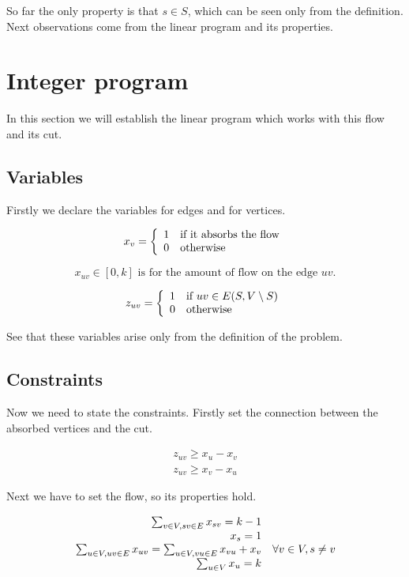 \documentclass{article}
\begin{document}
	So far the only property is that $s \in S$, which can be seen only from the definition. Next observations come from the linear program and its properties.
	
	
	\section{Integer program}
	
	In this section we will establish the linear program which works with this flow and its cut.
	
	\subsection{Variables}
	
	Firstly we declare the variables for edges and for vertices.
	
	$$
	x_v = \left\{\begin{array}{l l}
		1 & \text{if it absorbs the flow} \\
		0 & \text{otherwise}
	\end{array}
	\right.
	$$
	
	$$
	x_{uv} \in [0,k] \text{ is for the amount of flow on the edge } uv.
	$$
	
	$$
	z_{uv} = \left\{\begin{array}{l l}
		1 & \text{if } uv \in E(S, V \setminus S)\\
		0 & \text{otherwise}
	\end{array}
	\right.
	$$
	
	See that these variables arise only from the definition of the problem.
	
	\subsection{Constraints}
	
	Now we need to state the constraints. Firstly set the connection between the absorbed vertices and the cut.
	
	$$
	\begin{array}{c}
		z_{uv} \geq x_u - x_v \\
		z_{uv} \geq x_v - x_u
	\end{array}
	$$
	
	Next we have to set the flow, so its properties hold.
	
	$$
	\begin{array}{r l}
		\sum_{v \in V, sv \in E} x_{sv} = k-1 \\
		x_s = 1 \\
		\sum_{u \in V, uv \in E} x_{uv} = \sum_{u \in V, vu \in E} x_{vu} + x_v & \forall v \in V, s \neq v \\
		\sum_{u \in V} x_u = k
	\end{array}
	$$
	
\end{document}
